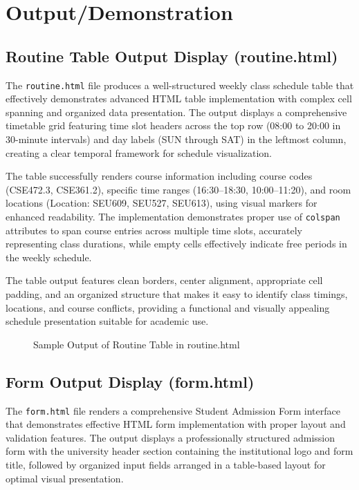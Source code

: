 \documentclass[twoside]{article}
\begin{document}


\section{Output/Demonstration}

\subsection{Routine Table Output Display (routine.html)}

The \texttt{routine.html} file produces a well-structured weekly class schedule table that effectively demonstrates advanced HTML table implementation with complex cell spanning and organized data presentation. The output displays a comprehensive timetable grid featuring time slot headers across the top row (08:00 to 20:00 in 30-minute intervals) and day labels (SUN through SAT) in the leftmost column, creating a clear temporal framework for schedule visualization.

The table successfully renders course information including course codes (CSE472.3, CSE361.2), specific time ranges (16:30--18:30, 10:00--11:20), and room locations (Location: SEU609, SEU527, SEU613), using visual markers for enhanced readability. The implementation demonstrates proper use of \texttt{colspan} attributes to span course entries across multiple time slots, accurately representing class durations, while empty cells effectively indicate free periods in the weekly schedule.

The table output features clean borders, center alignment, appropriate cell padding, and an organized structure that makes it easy to identify class timings, locations, and course conflicts, providing a functional and visually appealing schedule presentation suitable for academic use.

\begin{figure}[H]
    \centering
    \caption{Sample Output of Routine Table in routine.html}
\end{figure}

\subsection{Form Output Display (form.html)}
The \texttt{form.html} file renders a comprehensive Student Admission Form interface that demonstrates effective HTML form implementation with proper layout and validation features. The output displays a professionally structured admission form with the university header section containing the institutional logo and form title, followed by organized input fields arranged in a table-based layout for optimal visual presentation.
\end{document}
